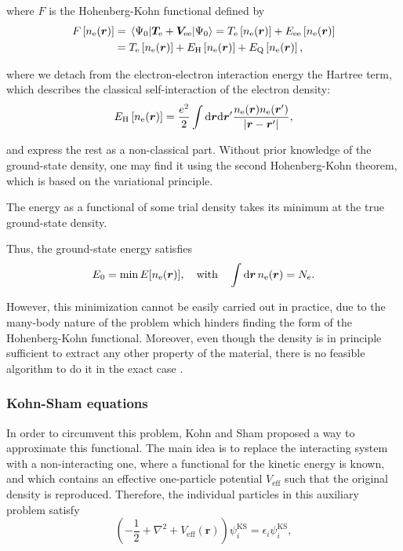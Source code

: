where \(F\) is the Hohenberg-Kohn functional defined by\parencite{Papior2016}
\begin{equation}
\begin{split}
F\left[n_{\mathrm{e}}(\bm{r})\right]&=\expval{\bm T_{\mathrm e}+\bm V_{\mathrm{ee}}}{\Psi_0}=T_{\mathrm e}\left[n_{\mathrm{e}}(\bm{r})\right]+E_{\mathrm{ee}}\left[n_{\mathrm{e}}(\bm{r})\right]\\
&=T_{\mathrm e}\left[n_{\mathrm{e}}(\bm{r})\right]+E_{\mathrm{H}}\left[n_{\mathrm{e}}(\bm{r})\right]+E_{\mathrm{Q}}\left[n_{\mathrm{e}}(\bm{r})\right],
\end{split}
\end{equation}

where we detach from the electron-electron interaction energy the Hartree term, which describes the classical self-interaction of the electron density:
\begin{equation}
\label{hartree}
E_{\mathrm{H}}\left[n_{\mathrm{e}}(\bm{r})\right]=\frac {e^2} 2 \int\mathrm{d}\bm r\mathrm{d}\bm{r}'\frac{n_{\mathrm{e}}(\bm{r})n_{\mathrm{e}}(\bm{r}')}{\abs{\bm{r} - \bm{r}'}},
\end{equation}

and express the rest as a non-classical part. Without prior knowledge of the ground-state density, one may find it using the second Hohenberg-Kohn theorem, which is based on the variational principle.

\begin{theorem}
The energy as a functional of some trial density takes its minimum at the true ground-state density.
\end{theorem}

Thus, the ground-state energy satisfies
\begin{equation}
E_0=\min E[n_{\mathrm e}(\bm r)],\quad \mathrm{with}\quad \int \mathrm{d}\bm r\, n_{\mathrm e}(\bm{r})=N_e.
\end{equation}

However, this minimization cannot be easily carried out in practice, due to the many-body nature of the problem which hinders finding the form of the Hohenberg-Kohn functional. Moreover, even though the density is in principle sufficient to extract any other property of the material, there is no feasible algorithm to do it in the exact case \parencite{Martin2004}. 

\subsubsection*{Kohn-Sham equations}
In order to circumvent this problem, Kohn and Sham proposed a way to approximate this functional\parencite{Kohn1965}. The main idea is to replace the interacting system with a non-interacting one, where a functional for the kinetic energy is known, and which contains an effective one-particle potential \(V_{\mathrm{eff}}\) such that the original density is reproduced. Therefore, the individual particles in this auxiliary problem satisfy
\begin{equation}
\label{ks-eq}
\left(-\frac1 2+\nabla^2+V_{\mathrm{eff}}(\bm r)\right)\psi^{\mathrm{KS}}_i=\epsilon_i \psi^{\mathrm{KS}}_i,
\end{equation}

